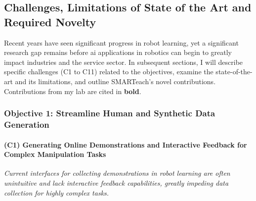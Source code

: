 \documentclass{erc-B2}
\begin{document}
\subsection{Challenges, Limitations of State of the Art and Required Novelty}
Recent years have seen significant progress in robot learning, yet a significant research gap remains before \gls*{ai} applications in robotics can begin to greatly impact industries and the service sector. In subsequent sections, I will describe specific challenges (C1 to C11) related to the objectives, examine the state-of-the-art and its limitations, and outline SMARTeach's novel contributions. Contributions from my lab are cited in \textbf{bold}.


\subsubsection{Objective 1: Streamline Human and Synthetic Data Generation}

\paragraph{(C1) Generating Online Demonstrations and Interactive Feedback for Complex Manipulation Tasks}

\textit{Current interfaces for collecting demonstrations in robot learning are often unintuitive and lack interactive feedback capabilities, greatly impeding data collection for highly complex tasks.} 
\end{document}
